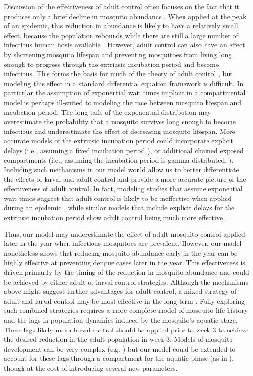 \documentclass[10pt,letterpaper]{article}
\begin{document}
Discussion of the effectiveness of adult control often focuses on the fact that it produces only a brief decline in mosquito abundance \cite{Newton1992, Esu2010}.
When applied at the peak of an epidemic, this reduction in abundance is likely to have a relatively small effect, because the population rebounds while there are still a large number of infectious human hosts available \cite{Newton1992, Burattini2008}. 
However, adult control can also have an effect by shortening mosquito lifespan and preventing mosquitoes from living long enough to progress through the extrinsic incubation period and become infectious.
This forms the basis for much of the theory of adult control \cite{Burattini2008, Morrison2008, Smith2012}, but modeling this effect in a standard differential equation framework is difficult.
In particular the assumption of exponential wait times implicit in a compartmental model is perhaps ill-suited to modeling the race between mosquito lifespan and incubation period.
The long tails of the exponential distribution may overestimate the probability that a mosquito survives long enough to become infectious and underestimate the effect of decreasing mosquito lifespan.
More accurate models of the extrinsic incubation period could incorporate explicit delays (i.e., assuming a fixed incubation period \cite{Burattini2008}), or additional chained exposed compartments (i.e., assuming the incubation period is gamma-distributed, \cite{Lloyd2001}).
Including such mechanisms in our model would allow us to better differentiate the effects of larval and adult control and provide a more accurate picture of the effectiveness of adult control.
In fact, modeling studies that assume exponential wait times suggest that adult control is likely to be ineffective when applied during an epidemic \cite{Newton1992, Pinho2010}, while similar models that include explicit delays for the extrinsic incubation period show adult control being much more effective \cite{Burattini2008}.

Thus, our model may underestimate the effect of adult mosquito control applied later in the year when infectious mosquitoes are prevalent.
However, our model nonetheless shows that reducing mosquito abundance early in the year can be highly effective at preventing dengue cases later in the year.
This effectiveness is driven primarily by the timing of the reduction in mosquito abundance and could be achieved by either adult or larval control strategies.
Although the mechanisms above might suggest further advantages for adult control, a mixed strategy of adult and larval control may be most effective in the long-term \cite{Burattini2008, Pinho2010}.
Fully exploring such combined strategies requires a more complete model of mosquito life history and the lags in population dynamics induced by the mosquito's aquatic stage.
These lags likely mean larval control should be applied prior to week 3 to achieve the desired reduction in the adult population in week 3.
Models of mosquito development can be very complex (e.g. \cite{Magori2009}) but our model could be extended to account for these lags through a compartment for the aquatic phase (as in \cite{Burattini2008, Pinho2010}), though at the cost of introducing several new parameters.
\end{document}
